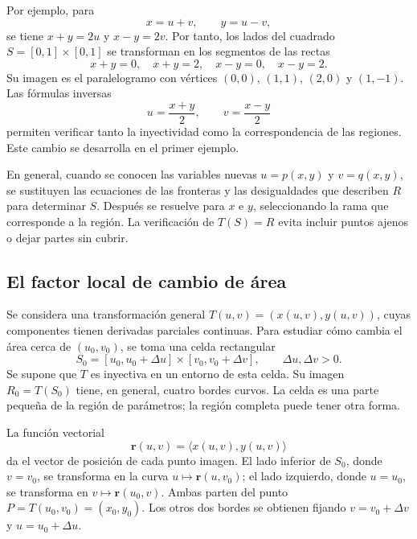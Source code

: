 Por ejemplo, para
\[
x=u+v,\qquad y=u-v,
\]
se tiene $x+y=2u$ y $x-y=2v$. Por tanto, los lados del cuadrado $S=[0,1]\times[0,1]$ se transforman en los segmentos de las rectas
\[
x+y=0,\quad x+y=2,\quad x-y=0,\quad x-y=2.
\]
Su imagen es el paralelogramo con vértices $(0,0)$, $(1,1)$, $(2,0)$ y $(1,-1)$. Las fórmulas inversas
\[
u=\frac{x+y}{2},\qquad v=\frac{x-y}{2}
\]
permiten verificar tanto la inyectividad como la correspondencia de las regiones. Este cambio se desarrolla en el primer ejemplo.

En general, cuando se conocen las variables nuevas $u=p(x,y)$ y $v=q(x,y)$, se sustituyen las ecuaciones de las fronteras y las desigualdades que describen $R$ para determinar $S$. Después se resuelve para $x$ e $y$, seleccionando la rama que corresponde a la región. La verificación de $T(S)=R$ evita incluir puntos ajenos o dejar partes sin cubrir.

\subsection{El factor local de cambio de área}

Se considera una transformación general $T(u,v)=(x(u,v),y(u,v))$, cuyas componentes tienen derivadas parciales continuas. Para estudiar cómo cambia el área cerca de $(u_0,v_0)$, se toma una celda rectangular
\[
S_0=[u_0,u_0+\Delta u]\times[v_0,v_0+\Delta v],
\qquad \Delta u,\Delta v>0.
\]
Se supone que $T$ es inyectiva en un entorno de esta celda. Su imagen $R_0=T(S_0)$ tiene, en general, cuatro bordes curvos. La celda es una parte pequeña de la región de parámetros; la región completa puede tener otra forma.

La función vectorial
\[
\mathbf{r}(u,v)=\langle x(u,v),y(u,v)\rangle
\]
da el vector de posición de cada punto imagen. El lado inferior de $S_0$, donde $v=v_0$, se transforma en la curva $u\mapsto\mathbf{r}(u,v_0)$; el lado izquierdo, donde $u=u_0$, se transforma en $v\mapsto\mathbf{r}(u_0,v)$. Ambas parten del punto $P=T(u_0,v_0)=(x_0,y_0)$. Los otros dos bordes se obtienen fijando $v=v_0+\Delta v$ y $u=u_0+\Delta u$.

